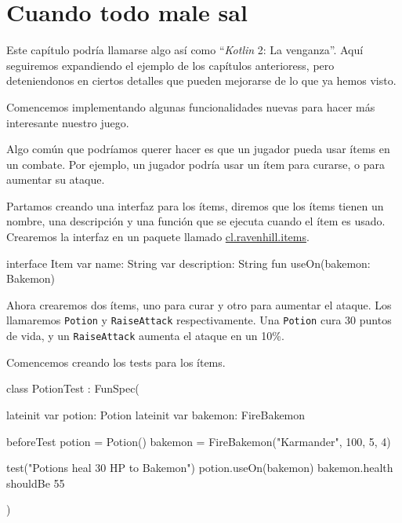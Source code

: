 \chapter{Cuando todo male sal}
  Este capítulo podría llamarse algo así como \enquote{\textit{Kotlin} 2: La venganza}.
  Aquí seguiremos expandiendo el ejemplo de los capítulos anterioress, pero deteniendonos en ciertos
  detalles que pueden mejorarse de lo que ya hemos visto.

  Comencemos implementando algunas funcionalidades nuevas para hacer más interesante nuestro juego.

  Algo común que podríamos querer hacer es que un jugador pueda usar ítems en un combate.
  Por ejemplo, un jugador podría usar un ítem para curarse, o para aumentar su ataque.

  Partamos creando una interfaz para los ítems, diremos que los ítems tienen un nombre, una 
  descripción y una función que se ejecuta cuando el ítem es usado.
  Crearemos la interfaz en un paquete llamado \url{cl.ravenhill.items}.

  \begin{kotlin}
    interface Item {
      var name: String
      var description: String
      fun useOn(bakemon: Bakemon)
    }
  \end{kotlin}

  Ahora crearemos dos ítems, uno para curar y otro para aumentar el ataque.
  Los llamaremos \texttt{Potion} y \texttt{RaiseAttack} respectivamente.
  Una \texttt{Potion} cura 30 puntos de vida, y un \texttt{RaiseAttack} aumenta el ataque en un 
  10\%.

  Comencemos creando los tests para los ítems.

  \begin{kotlin}
    class PotionTest : FunSpec({
      lateinit var potion: Potion
      lateinit var bakemon: FireBakemon

      beforeTest {
        potion = Potion()
        bakemon = FireBakemon("Karmander", 100, 5, 4)
      }
      
      test("Potions heal 30 HP to Bakemon") {
        potion.useOn(bakemon)
        bakemon.health shouldBe 55
      }
    })
  \end{kotlin}


